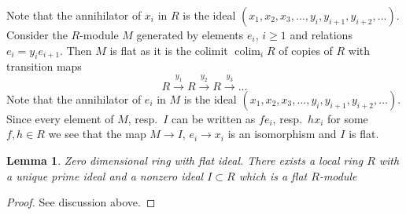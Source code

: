 \documentclass[10pt,a4paper]{amsart}
\newenvironment{slogan}{\comment}{\endcomment}
\theoremstyle{plain}
\newtheorem{lemma}[subsection]{Lemma}
\theoremstyle{definition}
\theoremstyle{remark}
\numberwithin{equation}{subsection}
\def\colim{\mathop{\mathrm{colim}}\nolimits}
\begin{document}
\medskip\noindent
Note that the annihilator of $x_i$ in $R$ is the ideal
$(x_1, x_2, x_3, \ldots, y_i, y_{i + 1}, y_{i + 2}, \ldots)$.
Consider the $R$-module $M$ generated by elements $e_i$, $i \geq 1$ and
relations $e_i = y_i e_{i + 1}$. Then $M$ is flat as it is the
colimit $\colim_i R$ of copies of $R$ with transition maps
$$
R \xrightarrow{y_1} R \xrightarrow{y_2} R \xrightarrow{y_3} \ldots
$$
Note that the annihilator of $e_i$ in $M$ is the ideal
$(x_1, x_2, x_3, \ldots, y_i, y_{i + 1}, y_{i + 2}, \ldots)$.
Since every element of $M$, resp.\ $I$ can be written as
$f e_i$, resp.\ $h x_i$ for some $f, h \in R$ we see that the
map $M \to I$, $e_i \to x_i$ is an isomorphism and $I$ is flat.

\begin{lemma}
\label{lemma-zero-dimensional-flat-ideal}
\begin{slogan}
Zero dimensional ring with flat ideal.
\end{slogan}
There exists a local ring $R$ with a unique prime ideal
and a nonzero ideal $I \subset R$ which is a flat $R$-module
\end{lemma}

\begin{proof}
See discussion above.
\end{proof}
\end{document}
